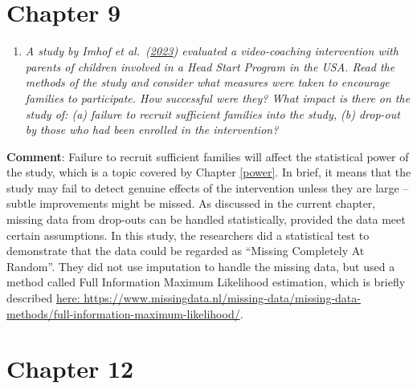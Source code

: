 \documentclass{krantz}
\providecommand{\tightlist}{%
\setlength{\itemsep}{0pt}\setlength{\parskip}{0pt}}
\begin{document}
\hypertarget{chapter-9}{%
\section{Chapter 9}\label{chapter-9}}

\begin{enumerate}
\def\labelenumi{\arabic{enumi}.}
\tightlist
\item
  \emph{A study by Imhof et al.~(\href{file:///Users/dorothybishop/Rprojects/EvaluatingWhatWorks2023/_book/dropouts.html\#ref-imhof2023}{2023}) evaluated a video-coaching intervention with parents of children involved in a Head Start Program in the USA. Read the methods of the study and consider what measures were taken to encourage families to participate. How successful were they? What impact is there on the study of: (a) failure to recruit sufficient families into the study, (b) drop-out by those who had been enrolled in the intervention?}
\end{enumerate}

\textbf{Comment}: Failure to recruit sufficient families will affect the statistical power of the study, which is a topic covered by Chapter \ref{power}. In brief, it means that the study may fail to detect genuine effects of the intervention unless they are large -- subtle improvements might be missed. As discussed in the current chapter, missing data from drop-outs can be handled statistically, provided the data meet certain assumptions. In this study, the researchers did a statistical test to demonstrate that the data could be regarded as ``Missing Completely At Random''. They did not use imputation to handle the missing data, but used a method called Full Information Maximum Likelihood estimation, which is briefly described \href{https://www.missingdata.nl/missing-data/missing-data-methods/full-information-maximum-likelihood/}{here: https://www.missingdata.nl/missing-data/missing-data-methods/full-information-maximum-likelihood/}.

\hypertarget{chapter-12}{%
\section{Chapter 12}\label{chapter-12}}
\end{document}
